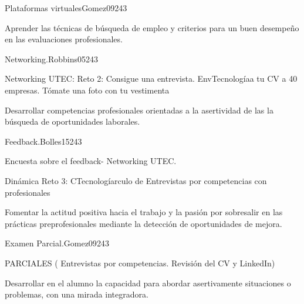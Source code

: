 \begin{syllabus}
\begin{unit}{Plataformas virtuales}{}{Gomez09}{24}{3}
   \begin{learningoutcomes}
      \item Aprender las técnicas de búsqueda de empleo y criterios para un buen desempeño en las evaluaciones profesionales.
   \end{learningoutcomes}
\end{unit}

\begin{unit}{Networking.}{}{Robbins05}{24}{3}
   \begin{topics}
      \item Networking UTEC: Reto 2: Consigue una entrevista. EnvTecnologíaa tu CV a 40 empresas. Tómate una foto con tu vestimenta
   \end{topics}

   \begin{learningoutcomes}
      \item Desarrollar competencias profesionales orientadas a la asertividad de las la búsqueda de oportunidades laborales.
   \end{learningoutcomes}
\end{unit}

\begin{unit}{Feedback.}{}{Bolles15}{24}{3}
   \begin{topics}
      \item Encuesta sobre el feedback- Networking UTEC.
      \item Dinámica Reto 3: CTecnologíarculo de Entrevistas por competencias con profesionales
   \end{topics}

   \begin{learningoutcomes}
      \item Fomentar la actitud positiva hacia el trabajo y la pasión por sobresalir en las prácticas preprofesionales mediante la detección de oportunidades de mejora.
   \end{learningoutcomes}
\end{unit}

\begin{unit}{Examen Parcial.}{}{Gomez09}{24}{3}
   \begin{topics}
      \item PARCIALES ( Entrevistas por competencias. Revisión del CV y LinkedIn) 
   \end{topics}

   \begin{learningoutcomes}
      \item Desarrollar en el alumno la capacidad para abordar asertivamente situaciones o problemas, con una mirada integradora.
   \end{learningoutcomes}
\end{unit}


\end{syllabus}
